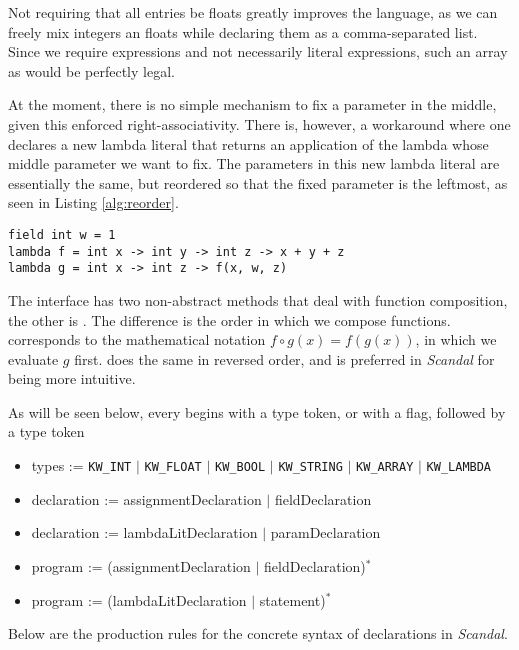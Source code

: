 Not requiring that all entries be floats greatly improves the language, as we can freely mix integers an floats while declaring them as a comma-separated list. Since we require expressions and not necessarily literal expressions, such an array as \il{[1, pow(2, 3.2), 3.5, pi]} would be perfectly legal.

At the moment, there is no simple mechanism to fix a parameter in the middle, given this enforced right-associativity. There is, however, a workaround where one declares a new lambda literal that returns an application of the lambda whose middle parameter we want to fix. The parameters in this new lambda literal are essentially the same, but reordered so that the fixed parameter is the leftmost, as seen in Listing \ref{alg:reorder}.

\begin{lstlisting}[emph={field,int,lambda,print},emphstyle={\textbf},caption={Right associativity of lambda expressions.},label={alg:reorder}]
field int w = 1
lambda f = int x -> int y -> int z -> x + y + z
lambda g = int x -> int z -> f(x, w, z)
\end{lstlisting}

The  interface has two non-abstract methods that deal with function composition, the other is . The difference is the order in which we compose functions.  corresponds to the mathematical notation $f \circ g(x) = f(g(x))$, in which we evaluate $g$ first.  does the same in reversed order, and is preferred in \emph{Scandal} for being more intuitive.

As will be seen below, every  begins with a type token, or with a  flag, followed by a type token

\begin{itemize}
	\item types := \texttt{KW\_INT} $|$ \texttt{KW\_FLOAT} $|$ \texttt{KW\_BOOL} $|$ \texttt{KW\_STRING} $|$ \texttt{KW\_ARRAY} $|$ \texttt{KW\_LAMBDA}
	\item declaration := assignmentDeclaration $|$ fieldDeclaration
	\item declaration := lambdaLitDeclaration $|$ paramDeclaration
	\item program := (assignmentDeclaration $|$ fieldDeclaration)$^*$
	\item program := (lambdaLitDeclaration $|$ statement)$^*$
\end{itemize}

Below are the production rules for the concrete syntax of declarations in \emph{Scandal}.

